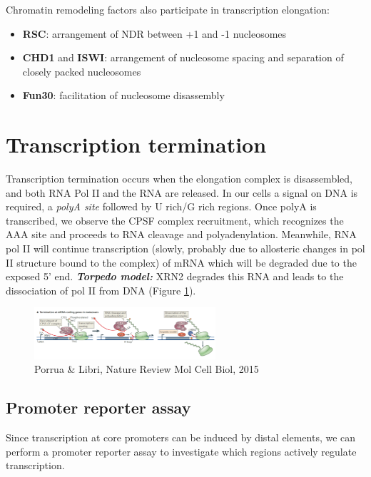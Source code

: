 Chromatin remodeling factors also participate in transcription elongation:

\begin{itemize}
\tightlist
\item
  \textbf{RSC}: arrangement of NDR between +1 and -1 nucleosomes
\item
  \textbf{CHD1} and \textbf{ISWI}: arrangement of nucleosome spacing and separation of closely packed nucleosomes
\item
  \textbf{Fun30}: facilitation of nucleosome disassembly
\end{itemize}

\hypertarget{termination}{%
\section{Transcription termination}\label{termination}}

Transcription termination occurs when the elongation complex is disassembled, and both RNA Pol II and the RNA are released. In our cells a signal on DNA is required, a \emph{polyA site} followed by U rich/G rich regions. Once polyA is transcribed, we observe the CPSF complex recruitment, which recognizes the AAA site and proceeds to RNA cleavage and polyadenylation. Meanwhile, RNA pol II will continue transcription (slowly, probably due to allosteric changes in pol II structure bound to the complex) of mRNA which will be degraded due to the exposed 5' end. \textbf{\emph{Torpedo model:}} XRN2 degrades this RNA and leads to the dissociation of pol II from DNA (Figure \ref{fig:torpedo}).

\begin{figure}
\centering
\includegraphics[width=0.6\textwidth]{../_resources/Screenshot_2022-10-10_at_10-38-48.png}
\caption{Porrua \& Libri, Nature Review Mol Cell Biol, 2015}
\label{fig:torpedo}
\end{figure}

\hypertarget{promoter-reporter-assay}{%
\subsection{Promoter reporter assay}\label{promoter-reporter-assay}}

Since transcription at core promoters can be induced by distal elements, we can perform a promoter reporter assay to investigate which regions actively regulate transcription.


